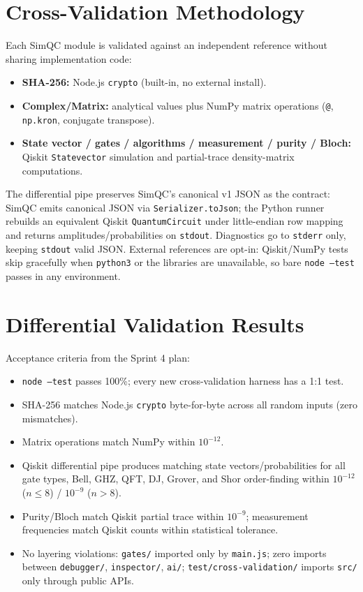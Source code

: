 \documentclass[conference]{IEEEtran}
\begin{document}
\section{Cross-Validation Methodology}
Each SimQC module is validated against an independent reference without sharing implementation code:
\begin{itemize}
    \item \textbf{SHA-256:} Node.js \texttt{crypto} (built-in, no external install).
    \item \textbf{Complex/Matrix:} analytical values plus NumPy matrix operations (\texttt{@}, \texttt{np.kron}, conjugate transpose).
    \item \textbf{State vector / gates / algorithms / measurement / purity / Bloch:} Qiskit \texttt{Statevector} simulation and partial-trace density-matrix computations.
\end{itemize}

The differential pipe preserves SimQC's canonical v1 JSON as the contract: SimQC emits canonical JSON via \texttt{Serializer.toJson}; the Python runner rebuilds an equivalent Qiskit \texttt{QuantumCircuit} under little-endian row mapping and returns amplitudes/probabilities on \texttt{stdout}. Diagnostics go to \texttt{stderr} only, keeping \texttt{stdout} valid JSON. External references are opt-in: Qiskit/NumPy tests skip gracefully when \texttt{python3} or the libraries are unavailable, so bare \texttt{node --test} passes in any environment.

\section{Differential Validation Results}
Acceptance criteria from the Sprint 4 plan:
\begin{itemize}
    \item \texttt{node --test} passes 100\%; every new cross-validation harness has a 1:1 test.
    \item SHA-256 matches Node.js \texttt{crypto} byte-for-byte across all random inputs (zero mismatches).
    \item Matrix operations match NumPy within $10^{-12}$.
    \item Qiskit differential pipe produces matching state vectors/probabilities for all gate types, Bell, GHZ, QFT, DJ, Grover, and Shor order-finding within $10^{-12}$ ($n\le8$) / $10^{-9}$ ($n>8$).
    \item Purity/Bloch match Qiskit partial trace within $10^{-9}$; measurement frequencies match Qiskit counts within statistical tolerance.
    \item No layering violations: \texttt{gates/} imported only by \texttt{main.js}; zero imports between \texttt{debugger/}, \texttt{inspector/}, \texttt{ai/}; \texttt{test/cross-validation/} imports \texttt{src/} only through public APIs.
\end{itemize}
\end{document}

